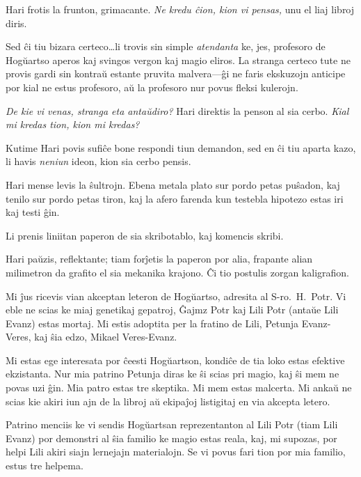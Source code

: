 Hari frotis la frunton, grimacante.
\emph{Ne kredu ĉion, kion vi pensas,} unu el liaj libroj diris.

Sed ĉi tiu bizara certeco…li trovis sin simple \emph{atendanta} ke, jes, profesoro de Hogŭartso aperos kaj svingos vergon kaj magio eliros.
La stranga certeco tute ne provis gardi sin kontraŭ estante pruvita malvera—ĝi ne faris ekskuzojn anticipe por kial ne estus profesoro, aŭ la profesoro nur povus fleksi kulerojn.

\emph{De kie vi venas, stranga eta antaŭdiro?}
Hari direktis la penson al sia cerbo.
\emph{Kial mi kredas tion, kion mi kredas?}

Kutime Hari povis sufiĉe bone respondi tiun demandon, sed en ĉi tiu aparta kazo, li havis \emph{neniun} ideon, kion sia cerbo pensis.

Hari mense levis la ŝultrojn.
Ebena metala plato sur pordo petas puŝadon, kaj tenilo sur pordo petas tiron, kaj la afero farenda kun testebla hipotezo estas iri kaj testi ĝin.

Li prenis liniitan paperon de sia skribotablo, kaj komencis skribi.

\begin{writtenNote}
\end{writtenNote}

Hari paŭzis, reflektante; tiam forĵetis la paperon por alia, frapante alian milimetron da grafito el sia mekanika krajono.
Ĉi tio postulis zorgan kaligrafion.

\begin{writtenNote}


Mi ĵus ricevis vian akceptan leteron de Hogŭartso, adresita al S\nobreakdash-ro.~H.~Potr.
Vi eble ne scias ke miaj genetikaj gepatroj, Ĝajmz Potr kaj Lili Potr (antaŭe Lili Evanz) estas mortaj.
Mi estis adoptita per la fratino de Lili, Petunja Evanz-Veres, kaj ŝia edzo, Mikael Veres-Evanz.

Mi estas ege interesata por ĉeesti Hogŭartson, kondiĉe de tia loko estas efektive ekzistanta.
Nur mia patrino Petunja diras ke ŝi scias pri magio, kaj ŝi mem ne povas uzi ĝin.
Mia patro estas tre skeptika.
Mi mem estas malcerta.
Mi ankaŭ ne scias kie akiri iun ajn de la libroj aŭ ekipaĵoj listigitaj en via akcepta letero.

Patrino menciis ke vi sendis Hogŭartsan reprezentanton al Lili Potr (tiam Lili Evanz) por demonstri al ŝia familio ke magio estas reala, kaj, mi supozas, por helpi Lili akiri siajn lernejajn materialojn.
Se vi povus fari tion por mia familio, estus tre helpema.

\end{writtenNote}

